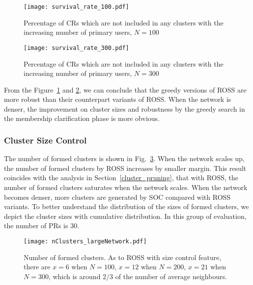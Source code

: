 \documentclass[journal,comsoc]{IEEEtran}
\theoremstyle{mytheoremstyle}
\theoremstyle{mytheoremstyle}
\theoremstyle{mytheoremstyle}
\begin{document}
\begin{figure}[!h]
  \centering
  \texttt{[image: survival\_rate\_100.pdf]}
  \caption{Percentage of CRs which are not included in any clusters with the increasing number of primary users, $N=100$}
  \label{singleton_clusters_100}
\end{figure}
  
  \begin{figure}[!h]
    \centering
   \texttt{[image: survival\_rate\_300.pdf]}
  \caption{Percentage of CRs which are not included in any clusters with the increasing number of primary users, $N=300$}
  \label{singleton_clusters_300}
\end{figure}

From the Figure~\ref{singleton_clusters_100} and \ref{singleton_clusters_300}, we can conclude that the greedy versions of ROSS are more robust than their counterpart variants of ROSS.
When the network is denser, the improvement on cluster sizes and robustness by the greedy search in the membership clarification phase is more obvious.


\subsubsection{Cluster Size Control}

The number of formed clusters is shown in Fig.~\ref{nClusters_largeNetwork}.
When the network scales up, the number of formed clusters by ROSS increases by smaller margin.
This result coincides with the analysis in Section~\ref{cluster_pruning}, that with ROSS, the number of formed clusters saturates when the network scales.
When the network becomes denser, more clusters are generated by SOC compared with ROSS variants.
To better understand the distribution of the sizes of formed clusters, we depict the cluster sizes with cumulative distribution.
In this group of evaluation, the number of PRs is 30.

\begin{figure}[!h]
  \centering
   \texttt{[image: nClusters\_largeNetwork.pdf]}
  \caption{Number of formed clusters. As to ROSS with size control feature, there are $x=6$ when $N=100$, $x=12$ when $N=200$, $x=21$ when $N=300$, which is around $2/3$ of the number of average neighbours.}
  \label{nClusters_largeNetwork}
\end{figure}
\end{document}
